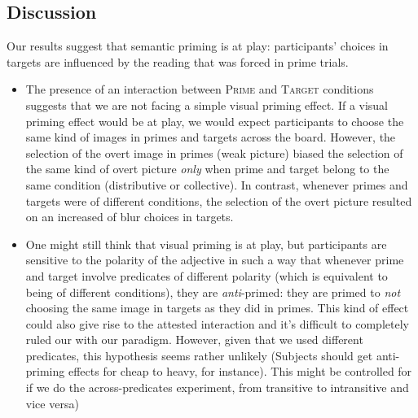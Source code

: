 \documentclass[a4paper, 11pt]{article}
\newcommand{\addMM}[1]{{\leavevmode\color{red}#1}}
\begin{document}
\subsection{Discussion}
Our results suggest that semantic priming is at play: participants' choices in targets are influenced by the reading that was forced in prime trials. 

\begin{itemize}

\item The presence of an interaction between \textsc{Prime} and \textsc{Target} conditions suggests that we are not facing a simple visual priming effect. If a visual priming effect would be at play, we would expect participants to choose the same kind of images in primes and targets across the board. 
However, the selection of the overt image in primes (weak picture) biased the selection of the same kind of overt picture \emph{only} when prime and target belong to the same condition (distributive or collective). In contrast, whenever primes and targets were of different conditions, the selection of the overt picture resulted on an increased of blur choices in targets. 

\item One might still think that visual priming is at play, but participants are sensitive to the polarity of the adjective in such a way that whenever prime and target involve predicates of different polarity (which is equivalent to being of different conditions), they are \emph{anti}-primed: they are primed to \emph{not} choosing the same image in targets as they did in primes. This kind of effect could also give rise to the attested interaction and it's difficult to completely ruled our with our paradigm. 
However, given that we used different predicates, this hypothesis seems rather unlikely (\addMM{Subjects should get anti-priming effects for cheap to heavy, for instance}). 
\addMM{This might be controlled for if we do the across-predicates experiment, from transitive to intransitive and vice versa)}

\end{itemize}
\end{document}
